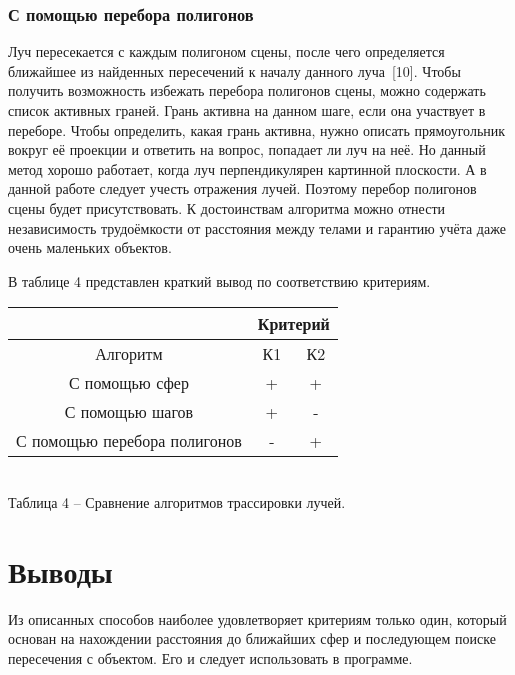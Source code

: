 {    \subsubsection{С помощью перебора полигонов} {
        Луч пересекается с каждым полигоном сцены, после чего определяется ближайшее
        из найденных пересечений к началу данного луча~[10].
        Чтобы получить возможность избежать перебора полигонов сцены, можно содержать
        список активных граней.
        Грань активна на данном шаге, если она участвует в переборе.
        Чтобы определить, какая грань активна, нужно описать прямоугольник вокруг
        её проекции и ответить на вопрос, попадает ли луч на неё.
        Но данный метод хорошо работает, когда луч перпендикулярен
        картинной плоскости.
        А в данной работе следует учесть отражения лучей.
        Поэтому перебор полигонов сцены будет присутствовать.
        К достоинствам алгоритма можно отнести независимость трудоёмкости от расстояния между телами и гарантию учёта даже очень маленьких объектов.
    }

    В таблице 4 представлен краткий вывод по соответствию критериям.
    
    \begin{center}
        \begin{tabular} { |c|c|c| }
            \hline
            \hspace{0pt} & \multicolumn{2}{|c|}{Критерий} \\
            \hline
            Алгоритм & К1 & К2 \\
            \hline
            С помощью сфер & + & + \\
            \hline
            С помощью шагов & + & - \\
            \hline
            С помощью перебора полигонов & - & + \\
            \hline
        \end{tabular}
        \\
    \vspace{2mm}
    \small { Таблица 4 -- Сравнение алгоритмов трассировки лучей. }
    \end{center}

    \section*{Выводы} {
        Из описанных способов наиболее удовлетворяет критериям только
        один, который основан на нахождении расстояния до ближайших сфер
        и последующем поиске пересечения с объектом.
        Его и следует использовать в программе.
    }
}
